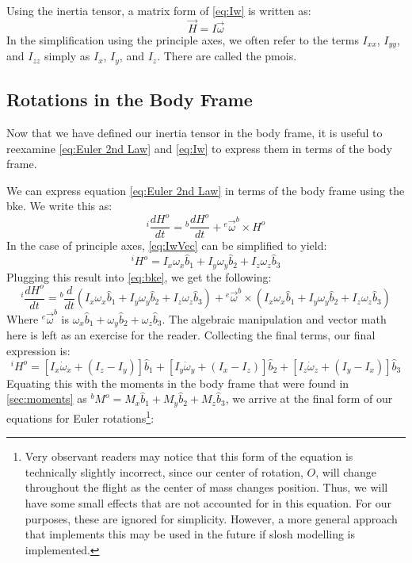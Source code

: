 \documentclass[12pt]{report}
\begin{document}
Using the inertia tensor, a matrix form of \eqref{eq:Iw}  is written as:
\begin{equation}\label{eq:IwVec}
    \vec{H}=I\vec{\omega}
\end{equation}
In the simplification using the principle axes, we often refer to the terms $I_{xx}$, $I_{yy}$, and $I_{zz}$ simply as $I_x$, $I_y$, and $I_z$. There are called the \glspl{pmoi}.
\subsection{Rotations in the Body Frame}\label{sec:rotations in the body frame}
Now that we have defined our inertia tensor in the body frame, it is useful to reexamine \eqref{eq:Euler 2nd Law} and \eqref{eq:Iw} to express them in terms of the body frame.

We can express equation \eqref{eq:Euler 2nd Law} in terms of the body frame using the \gls{bke}. We write this as:
\begin{equation}\label{eq:bke}
{}^i\frac{dH^o}{dt}={}^b\frac{dH^o}{dt}+{}^e\vec{\omega}^b\times H^o
\end{equation}
In the case of principle axes, \eqref{eq:IwVec} can be simplified to yield:
$${}^iH^o=I_x\omega_x\hat{b}_1+I_y\omega_y\hat{b}_2+I_z\omega_z\hat{b}_3$$
Plugging this result into \eqref{eq:bke}, we get the following:
$${}^i\frac{dH^o}{dt}={}^b\frac{d}{dt}\left(I_x\omega_x\hat{b}_1+I_y\omega_y\hat{b}_2+I_z\omega_z\hat{b}_3\right)+{}^e\vec{\omega}^b\times \left(I_x\omega_x\hat{b}_1+I_y\omega_y\hat{b}_2+I_z\omega_z\hat{b}_3\right)$$
Where ${}^e\vec{\omega}^b$ is $\omega_x\hat{b}_1+\omega_y\hat{b}_2+\omega_z\hat{b}_3$. The algebraic manipulation and vector math here is left as an exercise for the reader. Collecting the final terms, our final expression is:
$${}^iH^o=\left[I_x\dot{\omega}_x+\left(I_z-I_y\right)\right]\hat{b}_1+\left[I_y\dot{\omega}_y+\left(I_x-I_z\right)\right]\hat{b}_2+\left[I_z\dot{\omega}_z+\left(I_y-I_x\right)\right]\hat{b}_3$$
Equating this with the moments in the body frame that were found in \ref{sec:moments} as ${}^bM^o=M_x\hat{b}_1+M_y\hat{b}_2+M_z\hat{b}_3$, we arrive at the final form of our equations for Euler rotations\footnote{Very observant readers may notice that this form of the equation is technically slightly incorrect, since our center of rotation, $O$, will change throughout the flight as the center of mass changes position. Thus, we will have some small effects that are not accounted for in this equation. For our purposes, these are ignored for simplicity. However, a more general approach that implements this may be used in the future if slosh modelling is implemented.}:
\end{document}
